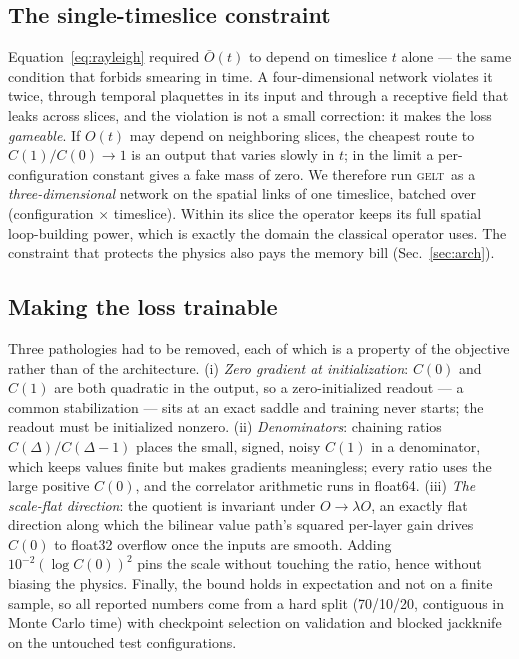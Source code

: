 \documentclass[aps,prl,reprint,superscriptaddress,nofootinbib]{revtex4-2}
\newcommand{\Obar}{\bar{O}}
\newcommand{\GELT}{\textsc{gelt}}
\begin{document}
\subsection{The single-timeslice constraint}
\label{sec:constraint}

Equation~\eqref{eq:rayleigh} required $\Obar(t)$ to depend on timeslice $t$
alone --- the same condition that forbids smearing in time. A four-dimensional
network violates it twice, through temporal plaquettes in its input and through
a receptive field that leaks across slices, and the violation is not a small
correction: it makes the loss \emph{gameable}. If $O(t)$ may depend on
neighboring slices, the cheapest route to $C(1)/C(0)\to1$ is an output that
varies slowly in $t$; in the limit a per-configuration constant gives a fake
mass of zero. We therefore run \GELT\ as a \emph{three-dimensional} network on
the spatial links of one timeslice, batched over
(configuration $\times$ timeslice). Within its slice the operator keeps its full
spatial loop-building power, which is exactly the domain the classical operator
uses. The constraint that protects the physics also pays the memory bill
(Sec.~\ref{sec:arch}).

\subsection{Making the loss trainable}

Three pathologies had to be removed, each of which is a property of the
objective rather than of the architecture.
(i) \emph{Zero gradient at initialization}: $C(0)$ and $C(1)$ are both quadratic
in the output, so a zero-initialized readout --- a common stabilization --- sits
at an exact saddle and training never starts; the readout must be initialized
nonzero.
(ii) \emph{Denominators}: chaining ratios $C(\Delta)/C(\Delta{-}1)$ places the
small, signed, noisy $C(1)$ in a denominator, which keeps values finite but
makes gradients meaningless; every ratio uses the large positive $C(0)$, and the
correlator arithmetic runs in float64.
(iii) \emph{The scale-flat direction}: the quotient is invariant under
$O\to\lambda O$, an exactly flat direction along which the bilinear value path's
squared per-layer gain drives $C(0)$ to float32 overflow once the inputs are
smooth. Adding $10^{-2}(\log C(0))^2$ pins the scale without touching the ratio,
hence without biasing the physics.
Finally, the bound holds in expectation and not on a finite sample, so all
reported numbers come from a hard split (70/10/20, contiguous in Monte Carlo
time) with checkpoint selection on validation and blocked jackknife on the
untouched test configurations.
\end{document}

